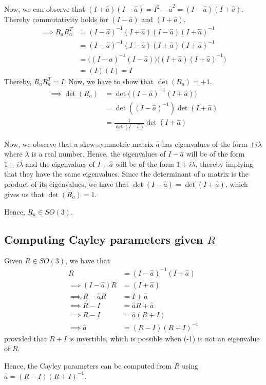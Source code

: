 Now, we can observe that \( (I + \hat{a}) (I - \hat{a}) = I^2 - \hat{a}^2 = (I - \hat{a}) (I + \hat{a}) \).\\
Thereby commutativity holds for \( (I - \hat{a}) \) and \( (I + \hat{a}) \).
\begin{align*}
    \implies
    R_a R_a^T
     & =
    (I - \hat{a})^{-1} (I + \hat{a}) (I - \hat{a}) (I + \hat{a})^{-1}
    \\ & =
    (I - \hat{a})^{-1} (I - \hat{a}) (I + \hat{a}) (I + \hat{a})^{-1}
    \\ & =
    \Big((I - \hat{a})^{-1} (I - \hat{a}) \Big) \Big( (I + \hat{a}) (I + \hat{a})^{-1} \Big)
    \\ & =
    (I)(I)
    = I
\end{align*}
Thereby, \( R_a R_a^T = I \).
Now, we have to show that \( \det(R_a) = +1 \).
\begin{align*}
    \implies
    \det(R_a)
     & = \det \Big( (I - \hat{a})^{-1} (I + \hat{a}) \Big)
    \\ & = \det \left( (I - \hat{a})^{-1} \right) \det (I + \hat{a})
    \\ & = \frac{1}{\det(I - \hat{a})} \det(I + \hat{a})
\end{align*}

Now, we observe that a skew-symmetric matrix \( \hat{a} \) has eigenvalues of the form \( \pm i \lambda \) where \( \lambda \) is a real number.
Hence, the eigenvalues of \( I - \hat{a} \) will be of the form \( 1 \pm i \lambda \) and the eigenvalues of \( I + \hat{a} \) will be of the form \( 1 \mp i \lambda \), thereby implying that they have the same eigenvalues.
Since the determinant of a matrix is the product of its eigenvalues, we have that \( \det(I - \hat{a}) = \det(I + \hat{a}) \), which gives us that \( \det(R_a) = 1 \).

Hence, \( \boxed{ R_a \in SO(3) } \).

\subsection*{Computing Cayley parameters given \( R \) }

Given \( R \in SO(3) \), we have that
\begin{align*}
    R
     & =
    (I - \hat{a})^{-1} (I + \hat{a})
    \\
    \implies
    (I - \hat{a}) R
     & =
    (I + \hat{a})
    \\
    \implies
    R - \hat{a} R
     & =
    I + \hat{a}
    \\
    \implies
    R - I
     & =
    \hat{a} R + \hat{a}
    \\
    \implies
    R - I
     & =
    \hat{a} (R + I)
    \\
    \implies
    \hat{a}
     & =
    (R - I)(R + I)^{-1}
\end{align*}
provided that \( R + I \) is invertible, which is possible when (-1) is not an eigenvalue of \( R \).

Hence, the Cayley parameters can be computed from \( R \) using \( \boxed{ \hat{a} = (R - I)(R + I)^{-1} } \).
